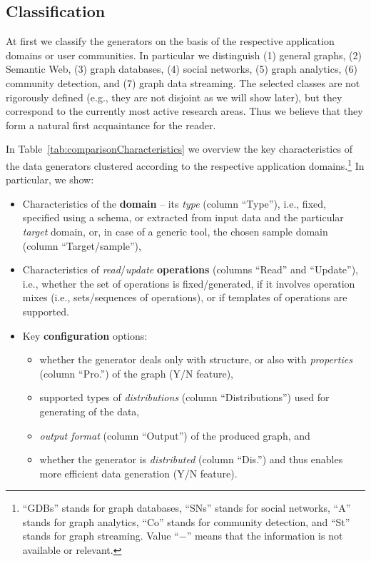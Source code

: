 %

\subsection{Classification}

At first we classify the generators on the basis of the respective application domains or user communities. In particular we distinguish (1) general graphs, (2) Semantic Web, (3) graph databases, (4) social networks, (5) graph analytics, (6) community detection, and (7) graph data streaming. The selected classes are not rigorously defined (e.g., they are not disjoint as we will show later), but they correspond to the currently most active research areas. Thus we believe that they form a natural first acquaintance for the reader.

In Table~\ref{tab:comparisonCharacteristics}   we overview the key characteristics of the data generators clustered according to the respective application domains.\footnote{``GDBs'' stands for graph databases, ``SNs'' stands for social networks, ``A'' stands for graph analytics, ``Co'' stands for community detection, and ``St'' stands for graph streaming. Value ``$-$'' means that the information is not available or relevant.} In particular, we show:

\begin{itemize}
\item Characteristics of the \textbf{domain} -- its \textit{type} (column ``Type''), i.e.,  fixed, specified using a schema, or extracted from input data and the particular \textit{target} domain, or, in case of a generic tool, the chosen sample domain (column ``Target/sample''),
\item Characteristics of \textit{read}/\textit{update} \textbf{operations} (columns ``Read'' and ``Update''), i.e., whether the set of operations is fixed/generated, if it involves operation mixes (i.e., sets/sequences of operations), or if templates of operations are supported.
\item Key \textbf{configuration} options:
  \begin{itemize}
    \item whether the generator deals only with structure, or also with \emph{properties} (column ``Pro.'') of the graph (Y/N feature),
    \item supported types of \emph{distributions} (column ``Distributions'') used for generating of the data,
    \item \textit{output format} (column ``Output'') of the produced graph, and
    \item  whether the generator is \textit{distributed} (column ``Dis.'') and thus enables more efficient data generation (Y/N feature).
  \end{itemize}
\end{itemize}


